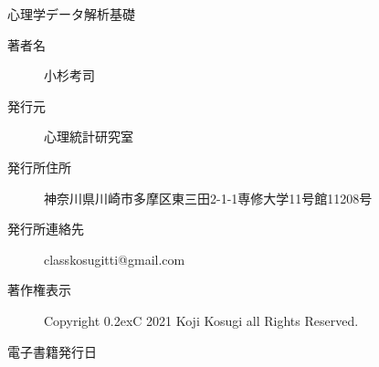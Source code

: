 

\vspace*{20pt}
\begin{center}
	\Large{心理学データ解析基礎}


	\vspace*{20pt}

	\large{}

	\large{}

	\vspace*{20pt}

	\begin{description}
		\item[著者名] 小杉考司
		\item[発行元] 心理統計研究室
		\item[発行所住所] 神奈川県川崎市多摩区東三田2-1-1専修大学11号館11208号
		\item[発行所連絡先] classkosugitti@gmail.com
		\item[著作権表示] Copyright \raise0.2ex\hbox{\textcircled{\scriptsize{C}}} 2021 Koji Kosugi all Rights Reserved.
		\item[電子書籍発行日] \date{\today}
	\end{description}
\end{center}

